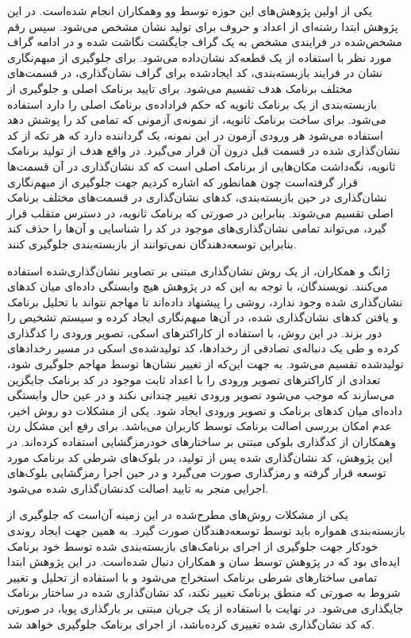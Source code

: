 یکی از اولین پژوهش‌های این حوزه توسط وو وهمکاران انجام شده‌است. در این پژوهش ابتدا رشته‌ای از اعداد و حروف برای تولید نشان‌ مشخص می‌شود. سپس رقم مشخص‌شده در فرایندی مشخص به یک گراف جایگشت نگاشت شده و در ادامه گراف مورد نظر با استفاده از یک قطعه‌کد نشان‌داده می‌شود. برای جلوگیری از مبهم‌نگاری نشان در فرایند بازبسته‌بندی، کد ایجاد‌شده برای گراف‌ نشان‌گذاری، در قسمت‌های مختلف برنامک هدف تقسیم می‌شود. برای تایید برنامک اصلی و جلوگیری از بازبسته‌بندی از یک برنامک ثانویه که حکم فراداده‌ی برنامک اصلی را دارد استفاده می‌شود. برای ساخت برنامک ثانویه، از نمونه‌ی آزمونی که تمامی کد را پوشش دهد استفاده می‌شود هر ورودی آزمون در این نمونه، یک گرداننده دارد که هر تکه از کد نشان‌گذاری شده در قسمت قبل درون آن قرار می‌گیرد. در واقع هدف از تولید برنامک ثانویه، نگه‌داشت مکان‌هایی از برنامک اصلی است که کد نشان‌گذاری در آن قسمت‌ها قرار گرفته‌است چون همانطور که اشاره کردیم جهت جلوگیری از مبهم‌نگاری نشان‌گذاری در حین بازبسته‌بندی، کد‌های نشان‌گذاری در قسمت‌های مختلف برنامک اصلی تقسیم می‌شوند. بنابراین در صورتی که برنامک ثانویه، در دسترس متقلب قرار گیرد، می‌تواند تمامی نشان‌گذاری‌های موجود در کد را شناسایی و آن‌ها را حذف کند بنابراین توسعه‌دهندگان نمی‌توانند از بازبسته‌بندی جلوگیری کنند.

ژانگ و همکاران، از یک روش نشان‌گذاری مبتنی بر تصاویر نشان‌گذاری‌شده استفاده می‌کنند. نویسندگان، با توجه به این که در پژوهش هیچ وابستگی داده‌ای میان کد‌های نشان‌گذاری شده وجود ندارد، روشی را پیشنهاد داده‌اند تا مهاجم نتواند با تحلیل برنامک‌ و یافتن کد‌های نشان‌گذاری شده، در آن‌ها مبهم‌نگاری ایجاد کرده و سیستم تشخیص را دور بزند. در این روش، با استفاده از کاراکتر‌های اسکی‌، تصویر ورودی را کدگذاری کرده و طی یک دنباله‌ی تصادفی از رخداد‌ها، کد تولید‌شده‌ی اسکی در مسیر رخداد‌های تولید‌شده تقسیم می‌شود. به جهت این‌که از تغییر نشان‌ها توسط مهاجم جلوگیری شود، تعدادی از کاراکتر‌های تصویر ورودی را با اعداد ثابت موجود در کد برنامک جایگزین می‌سازند که موجب می‌شود تصویر ورودی تغییر چندانی نکند و در عین حال وابستگی داده‌ای میان کد‌های برنامک و تصویر ورودی ایجاد شود. یکی از مشکلات دو روش اخیر، عدم امکان بررسی اصالت برنامک توسط کاربران می‌باشد. برای رفع این مشکل رن وهمکاران از کد‌گذاری بلوکی مبتنی بر ساختار‌های خود‌رمزگشایی‌ استفاده کرده‌اند. در این پژوهش، کد نشان‌گذاری شده پس از تولید، در بلوک‌های شرطی کد برنامک مورد توسعه قرار گرفته و رمز‌گذاری صورت می‌گیرد و در حین اجرا رمز‌گشایی بلوک‌های اجرایی منجر به تایید اصالت کدنشان‌گذاری شده می‌شود.

یکی از مشکلات روش‌های مطرح‌شده در این زمینه‌ آن‌است که جلوگیری از بازبسته‌بندی همواره باید توسط توسعه‌دهندگان صورت گیرد. به همین جهت ایجاد روندی خودکار جهت جلوگیری از اجرای برنامک‌های بازبسته‌بندی شده توسط خود برنامک ایده‌ای بود که در پژوهش توسط سان و همکاران دنبال  شده‌است. در این پژوهش ابتدا تمامی ساختار‌های شرطی‌ برنامک استخراج می‌شود و با استفاده از تحلیل و تغییر شروط به صورتی که منطق برنامک تغییر نکند، کد نشان‌گذاری شده در ساختار برنامک جایگذاری می‌شود. در نهایت با استفاده از یک جریان مبتنی بر بارگذاری پویا، در صورتی که کد نشان‌گذاری شده تغییری کرده‌باشد، از اجرای برنامک جلوگیری خواهد شد.

